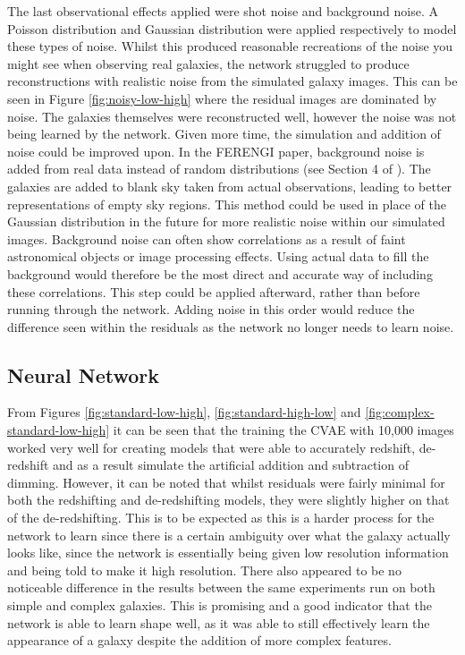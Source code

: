 \documentclass[fleqn,usenatbib]{mnras}
\begin{document}
The last observational effects applied were shot noise and background noise. A Poisson distribution and Gaussian distribution were applied respectively to model these types of noise. Whilst this produced reasonable recreations of the noise you might see when observing real galaxies, the network struggled to produce reconstructions with realistic noise from the simulated galaxy images. This can be seen in Figure \ref{fig:noisy-low-high} where the residual images are dominated by noise. The galaxies themselves were reconstructed well, however the noise was not being learned by the network. Given more time, the simulation and addition of noise could be improved upon. In the FERENGI paper, background noise is added from real data instead of random distributions (see Section 4 of \citet{Barden2008}). The galaxies are added to blank sky taken from actual observations, leading to better representations of empty sky regions. This method could be used in place of the Gaussian distribution in the future for more realistic noise within our simulated images. Background noise can often show correlations as a result of faint astronomical objects or image processing effects. Using actual data to fill the background would therefore be the most direct and accurate way of including these correlations. This step could be applied afterward, rather than before running through the network. Adding noise in this order would reduce the difference seen within the residuals as the network no longer needs to learn noise.

\subsection{Neural Network} \label{sec:NN-discussion}
From Figures \ref{fig:standard-low-high},  \ref{fig:standard-high-low} and \ref{fig:complex-standard-low-high} it can be seen that the training the CVAE with 10,000 images worked very well for creating models that were able to accurately redshift, de-redshift and as a result simulate the artificial addition and subtraction of dimming. However, it can be noted that whilst residuals were fairly minimal for both the redshifting and de-redshifting models, they were slightly higher on that of the de-redshifting. This is to be expected as this is a harder process for the network to learn since there is a certain ambiguity over what the galaxy actually looks like, since the network is essentially being given low resolution information and being told to make it high resolution. There also appeared to be no noticeable difference in the results between the same experiments run on both simple and complex galaxies. This is promising and a good indicator that the network is able to learn shape well, as it was able to still effectively learn the appearance of a galaxy despite the addition of more complex features.
\end{document}
